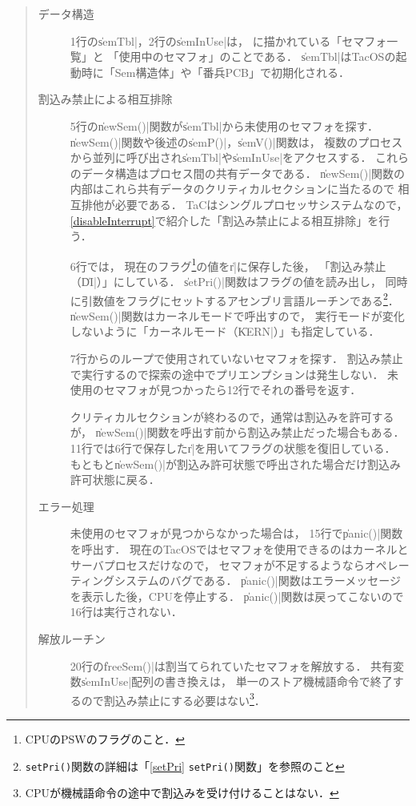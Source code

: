 \begin{quote}
\begin{description}
\item [データ構造]
1行の\|semTbl|，2行の\|semInUse|は，
に描かれている「セマフォ一覧」と
「使用中のセマフォ」のことである．
\|semTbl|はTacOSの起動時に「Sem構造体」や「番兵PCB」で初期化される．

\item [割込み禁止による相互排除]
5行の\|newSem()|関数が\|semTbl|から未使用のセマフォを探す．
\|newSem()|関数や後述の\|semP()|，\|semV()|関数は，
複数のプロセスから並列に呼び出され\|semTbl|や\|semInUse|をアクセスする．
これらのデータ構造はプロセス間の共有データである．
\|newSem()|関数の内部はこれら共有データのクリティカルセクションに当たるので
相互排他が必要である．
TaCはシングルプロセッサシステムなので，
\ref{disableInterrupt}で紹介した「割込み禁止による相互排除」を行う．

6行では，
現在のフラグ\footnote{CPUのPSWのフラグのこと．}の値を\|r|に保存した後，
「割込み禁止（\|DI|）」にしている．
\|setPri()|関数はフラグの値を読み出し，
同時に引数値をフラグにセットするアセンブリ言語ルーチンである\footnote{
{\tt setPri()}関数の詳細は「\ref{setPri} {\tt setPri()}関数」を参照のこと}．
\|newSem()|関数はカーネルモードで呼出すので，
実行モードが変化しないように「カーネルモード（\|KERN|）」も指定している．

7行からのループで使用されていないセマフォを探す．
割込み禁止で実行するので探索の途中でプリエンプションは発生しない．
未使用のセマフォが見つかったら12行でそれの番号を返す．

クリティカルセクションが終わるので，通常は割込みを許可するが，
\|newSem()|関数を呼出す前から割込み禁止だった場合もある．
11行では6行で保存した\|r|を用いてフラグの状態を復旧している．
もともと\|newSem()|が割込み許可状態で呼出された場合だけ割込み許可状態に戻る．

\item [エラー処理]
未使用のセマフォが見つからなかった場合は，
15行で\|panic()|関数を呼出す．
現在のTacOSではセマフォを使用できるのはカーネルとサーバプロセスだけなので，
セマフォが不足するようならオペレーティングシステムのバグである．
\|panic()|関数はエラーメッセージを表示した後，CPUを停止する．
\|panic()|関数は戻ってこないので16行は実行されない．

\item [解放ルーチン]
20行の\|freeSem()|は割当てられていたセマフォを解放する．
共有変数\|semInUse|配列の書き換えは，
単一のストア機械語命令で終了するので割込み禁止にする必要はない\footnote{
CPUが機械語命令の途中で割込みを受け付けることはない．}．
\end{description}
\end{quote}

